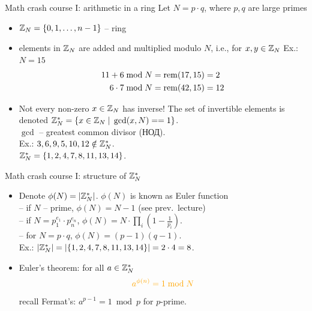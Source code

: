 \documentclass[usenames,dvipsnames, 9pt]{beamer}
\begin{document}
\begin{frame}{Math crash course I: arithmetic in a ring}
\Large 
{\color{Orange} Let $N = p \cdot q$, where $p, q$ are large primes}

\begin{itemize}
	\item ${{\mathbb Z}}_N = \left\{ 0, 1, \ldots, n-1 \right\}$ -- {\color{Orange} ring}
	\item elements in ${{\mathbb Z}}_N$ are added and multiplied modulo $N$, i.e., for $x, y \in {{\mathbb Z}}_N$
	Ex.: $N = 15$
	\begin{align*}
	11+6 \bmod N &= \mathrm{rem}(17, 15) = 2 \\
	6\cdot 7  \bmod N &= \mathrm{rem}(42, 15) = 12
	\end{align*}
	\pause
	\item Not every non-zero $x \in {{\mathbb Z}}_N$ has inverse!
	The set of invertible elements is denoted ${{\mathbb Z}}_N^{\ast} =\{x \in {{\mathbb Z}}_N \; | \;  \gcd(x,N) == 1\}$.\\
	{\large $\gcd $ -- greatest common divisor (НОД)}.\\[5pt]
	Ex.: $3, 6, 9, 5, 10, 12 \notin {{\mathbb Z}}_N^{\ast}$. \\
	${{\mathbb Z}}_N^{\ast} = \{1, 2, 4, 7, 8, 11, 13, 14\}$.
\end{itemize}

\end{frame}

\begin{frame}{Math crash course I: structure of ${{\mathbb Z}}_N^\ast$ }
\Large 
\begin{itemize}
	\itemsep 10pt
	\item Denote $\phi(N) = |{{\mathbb Z}}_N^\ast|$. $\phi(N)$ is known as {\color{Orange}Euler function} \\
	-- if $N$ -- prime, $\phi(N) = N-1$ (see prev.\ lecture)\\
	-- if $N = p_1^{e_1} \cdot p_n^{e_n}$, $\phi(N)=  N \cdot \prod_{i} \left(1 - \frac{1}{p_i}\right)$. \\
	-- for $N = p \cdot q$, {\color{Orange}$\phi(N) = (p-1)(q-1)$.} \\
	Ex.: $|{{\mathbb Z}}_N^{\ast}| = |\{1, 2, 4, 7, 8, 11, 13, 14\}| = 2 \cdot 4 = 8$.
	\pause
	\item {\color{Orange}Euler's theorem:} for all $a \in {{\mathbb Z}}_N^{\ast}$
	\[
	{\color{Orange}	a^{\phi(n)} = 1 \bmod N }
	\]
	{\large recall Fermat's: $a^{p-1} = 1 \bmod p$ for $p$-prime.}
\end{itemize}
\end{frame}
\end{document}

